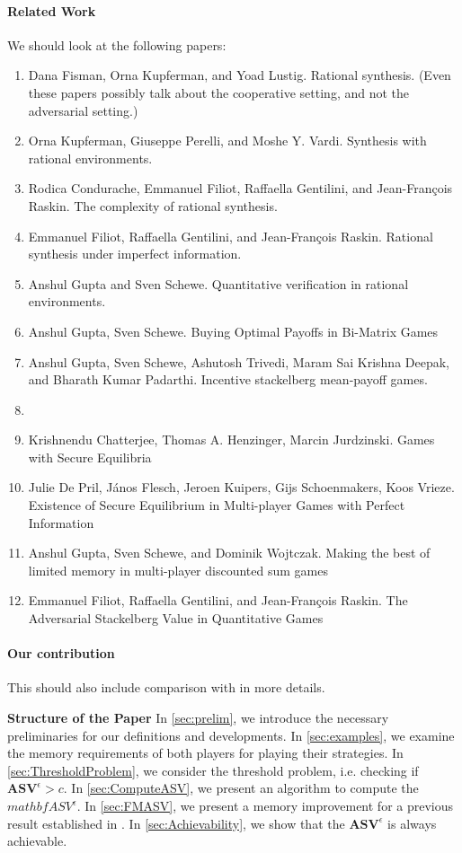 \paragraph{{\bf Related Work}} We should look at the following papers:
\begin{enumerate}
    \item Dana Fisman, Orna Kupferman, and Yoad Lustig. Rational synthesis. (Even these papers possibly talk about the cooperative setting, and not the adversarial setting.)
    \item Orna Kupferman, Giuseppe Perelli, and Moshe Y. Vardi. Synthesis with rational environments.
    \item Rodica Condurache, Emmanuel Filiot, Raffaella Gentilini, and Jean-François Raskin. The complexity of rational synthesis.
    \item Emmanuel Filiot, Raffaella Gentilini, and Jean-François Raskin. Rational synthesis under imperfect information. 
    \item Anshul Gupta and Sven Schewe. Quantitative verification in rational environments.
    \item Anshul Gupta, Sven Schewe. Buying Optimal Payoffs in Bi-Matrix Games
    \item Anshul Gupta, Sven Schewe, Ashutosh Trivedi, Maram Sai Krishna Deepak, and Bharath Kumar Padarthi. Incentive stackelberg mean-payoff games.
    \item {}
    \item Krishnendu Chatterjee, Thomas A. Henzinger, Marcin Jurdzinski. Games with Secure Equilibria
    \item Julie De Pril, János Flesch, Jeroen Kuipers, Gijs Schoenmakers, Koos Vrieze. Existence of Secure Equilibrium in Multi-player Games with Perfect Information
    \item Anshul Gupta, Sven Schewe, and Dominik Wojtczak. Making the best of limited memory in multi-player discounted sum games
    \item Emmanuel Filiot, Raffaella Gentilini, and Jean-François Raskin. The Adversarial Stackelberg Value in Quantitative Games
\end{enumerate}

\paragraph{{\bf Our contribution}} This should also include comparison with \cite{FGR20} in more details.

\textbf{Structure of the Paper} In \cref{sec:prelim}, we introduce the necessary preliminaries for our definitions and developments. In \cref{sec:examples}, we examine the memory requirements of both players for playing their strategies. In \cref{sec:ThresholdProblem}, we consider the threshold problem, i.e. checking if $\mathbf{ASV}^{\epsilon} > c$. In \cref{sec:ComputeASV}, we present an algorithm to compute the $mathbf{ASV}^{\epsilon}$. In \cref{sec:FMASV}, we present a memory improvement for a previous result established in \cite{FGR20}. In \cref{sec:Achievability}, we show that the $\mathbf{ASV}^{\epsilon}$ is always achievable.